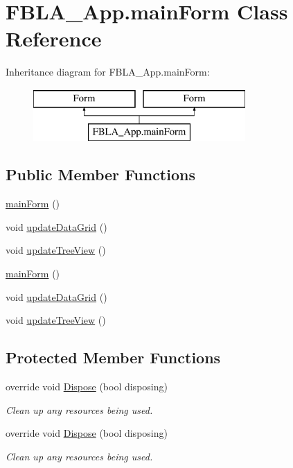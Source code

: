 \hypertarget{class_f_b_l_a___app_1_1main_form}{\section{F\+B\+L\+A\+\_\+\+App.\+main\+Form Class Reference}
\label{class_f_b_l_a___app_1_1main_form}
}
Inheritance diagram for F\+B\+L\+A\+\_\+\+App.\+main\+Form\+:\begin{figure}[H]
\begin{center}
\leavevmode
\includegraphics[height=2.000000cm]{class_f_b_l_a___app_1_1main_form}
\end{center}
\end{figure}
\subsection*{Public Member Functions}
\begin{DoxyCompactItemize}
\item 
\hyperlink{class_f_b_l_a___app_1_1main_form_ab0d735f5d284ff722db4bbc83953cf2a}{main\+Form} ()
\item 
void \hyperlink{class_f_b_l_a___app_1_1main_form_a4ffeef844ab8a56f8a8d0c2e0e707dfc}{update\+Data\+Grid} ()
\item 
void \hyperlink{class_f_b_l_a___app_1_1main_form_a0c7cec5edb77fccda2a7655acb037314}{update\+Tree\+View} ()
\item 
\hyperlink{class_f_b_l_a___app_1_1main_form_ab0d735f5d284ff722db4bbc83953cf2a}{main\+Form} ()
\item 
void \hyperlink{class_f_b_l_a___app_1_1main_form_a4ffeef844ab8a56f8a8d0c2e0e707dfc}{update\+Data\+Grid} ()
\item 
void \hyperlink{class_f_b_l_a___app_1_1main_form_a0c7cec5edb77fccda2a7655acb037314}{update\+Tree\+View} ()
\end{DoxyCompactItemize}
\subsection*{Protected Member Functions}
\begin{DoxyCompactItemize}
\item 
override void \hyperlink{class_f_b_l_a___app_1_1main_form_abaa528c7c366c2c70fa13e2ba711bd97}{Dispose} (bool disposing)
\begin{DoxyCompactList}\small\item\em Clean up any resources being used. \end{DoxyCompactList}\item 
override void \hyperlink{class_f_b_l_a___app_1_1main_form_abaa528c7c366c2c70fa13e2ba711bd97}{Dispose} (bool disposing)
\begin{DoxyCompactList}\small\item\em Clean up any resources being used. \end{DoxyCompactList}\end{DoxyCompactItemize}


